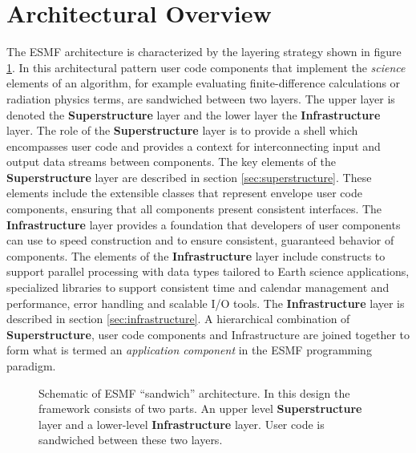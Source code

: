 
\section{Architectural Overview}
\label{sec:ArchOver}
The ESMF architecture is characterized by the layering strategy shown in figure \ref{fig:TheESMFwich}. In this architectural pattern user code components that implement the {\it science} elements of an algorithm, for example evaluating
finite-difference calculations or radiation physics terms, are sandwiched between two layers. The upper layer is
denoted the {\bf Superstructure} layer and the lower layer the {\bf Infrastructure} layer. The role of the {\bf Superstructure}
layer is to provide a shell which encompasses user code and provides a context for interconnecting input and output
data streams between components. The key elements of the {\bf Superstructure} layer are described in section \ref{sec:superstructure}.
These elements include the extensible classes that represent envelope user code components, ensuring that all
components present consistent interfaces. The {\bf Infrastructure} layer provides a foundation that developers of
user components can use to speed construction and to ensure consistent, guaranteed behavior of components.
The elements of the {\bf Infrastructure} layer include constructs to support parallel processing with data types tailored
to Earth science applications, specialized libraries to support consistent time and calendar management and
performance, error handling and scalable I/O tools. The {\bf Infrastructure} layer is described in section \ref{sec:infrastructure}.
A hierarchical combination of {\bf Superstructure}, user code components and Infrastructure are joined together
to form what is termed an {\it application component} in the ESMF programming paradigm.
\begin{center}
\begin{figure}
\caption{Schematic of ESMF ``sandwich'' architecture. In this design the framework consists of two parts. An upper level
{\bf Superstructure} layer and a lower-level {\bf Infrastructure} layer. User code is sandwiched between these two layers.}
\label{fig:TheESMFwich}
\end{figure}
\end{center}

